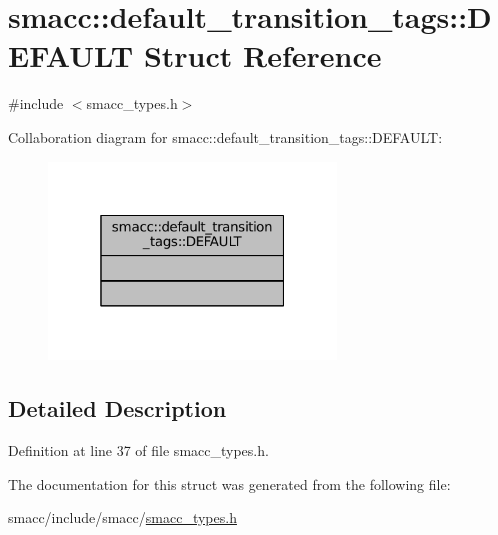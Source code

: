\hypertarget{structsmacc_1_1default__transition__tags_1_1DEFAULT}{}\section{smacc\+:\+:default\+\_\+transition\+\_\+tags\+:\+:D\+E\+F\+A\+U\+LT Struct Reference}
\label{structsmacc_1_1default__transition__tags_1_1DEFAULT}


{\ttfamily \#include $<$smacc\+\_\+types.\+h$>$}



Collaboration diagram for smacc\+:\+:default\+\_\+transition\+\_\+tags\+:\+:D\+E\+F\+A\+U\+LT\+:
\nopagebreak
\begin{figure}[H]
\begin{center}
\leavevmode
\includegraphics[width=217pt]{structsmacc_1_1default__transition__tags_1_1DEFAULT__coll__graph}
\end{center}
\end{figure}


\subsection{Detailed Description}


Definition at line 37 of file smacc\+\_\+types.\+h.



The documentation for this struct was generated from the following file\+:\begin{DoxyCompactItemize}
\item 
smacc/include/smacc/\hyperlink{smacc__types_8h}{smacc\+\_\+types.\+h}\end{DoxyCompactItemize}
